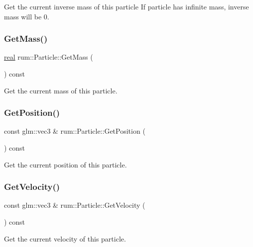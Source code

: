 Get the current inverse mass of this particle If particle has infinite mass, inverse mass will be 0. \mbox{\label{classrum_1_1_particle_a060c6f1db7424d67b4c01e6f7e538eca}} 
\subsubsection{\texorpdfstring{Get\+Mass()}{GetMass()}}
{\footnotesize\ttfamily \hyperlink{namespacerum_a7e8cca23573d5eaead0f138cbaa4862c}{real} rum\+::\+Particle\+::\+Get\+Mass (\begin{DoxyParamCaption}{ }\end{DoxyParamCaption}) const}

Get the current mass of this particle. \mbox{\label{classrum_1_1_particle_a78064d4405febbf7939070d1d2861594}} 
\subsubsection{\texorpdfstring{Get\+Position()}{GetPosition()}}
{\footnotesize\ttfamily const glm\+::vec3 \& rum\+::\+Particle\+::\+Get\+Position (\begin{DoxyParamCaption}{ }\end{DoxyParamCaption}) const}

Get the current position of this particle. \mbox{\label{classrum_1_1_particle_adc199154d918e360103fa99f5b697604}} 
\subsubsection{\texorpdfstring{Get\+Velocity()}{GetVelocity()}}
{\footnotesize\ttfamily const glm\+::vec3 \& rum\+::\+Particle\+::\+Get\+Velocity (\begin{DoxyParamCaption}{ }\end{DoxyParamCaption}) const}

Get the current velocity of this particle. \mbox{\label{classrum_1_1_particle_a0c19cd4e0c2933b4cc6357bb70c2c1a1}} 
